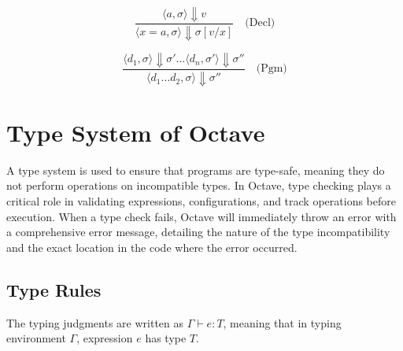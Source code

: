 \documentclass[letterpaper,12pt]{article}
\begin{document}
    \[
    \frac{\langle a, \sigma \rangle \Downarrow v}{\langle x = a, \sigma \rangle \Downarrow \sigma[v/x]} \quad \text{(Decl)}
    \]

    \[
    \frac{\langle d_1, \sigma \rangle \Downarrow \sigma' \dots \langle d_n, \sigma' \rangle \Downarrow \sigma''}{\langle d_1 \dots d_2, \sigma \rangle \Downarrow \sigma''} \quad \text{(Pgm)}
    \]
    

\section{Type System of Octave}

A type system is used to ensure that programs are type-safe, 
meaning they do not perform operations on incompatible types.
 In Octave, type checking plays a critical role in validating expressions, 
 configurations, and track operations before execution. When a type check fails, 
 Octave will immediately throw an error with a comprehensive error message, 
 detailing the nature of the type incompatibility and the exact location in the code where the
  error occurred. 

\subsection{Type Rules}

The typing judgments are written as \(\Gamma \vdash e : T\), meaning that in typing environment \(\Gamma\), expression \(e\) has type \(T\).
\end{document}
